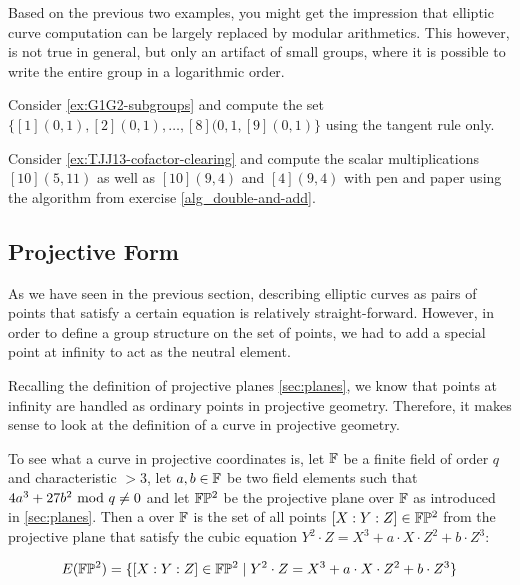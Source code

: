 Based on the previous two examples, you  might get the impression that elliptic curve computation can be largely replaced by modular arithmetics. This however, is not true in general, but only an artifact of small groups, where it is possible to write the entire group in a logarithmic order.
\begin{exercise} Consider \examplename{} \ref{ex:G1G2-subgroups} and compute the set 
$\{[1](0,1), [2](0,1),\ldots,[8](0,1,[9](0,1)\}$ using the tangent rule only.
\end{exercise}
\begin{exercise} Consider \examplename{} \ref{ex:TJJ13-cofactor-clearing} and compute the scalar multiplications $[10](5,11)$ as well as $[10](9,4)$ and $[4](9,4)$ with pen and paper using the algorithm from exercise \ref{alg_double-and-add}.
\end{exercise}
\subsection{Projective  Form}
As we have seen in the previous section, describing elliptic curves as pairs of points that satisfy a certain equation is relatively straight-forward. However, in order to define a group structure on the set of points, we had to add a special point at infinity to act as the neutral element. 

Recalling the definition of projective planes \ref{sec:planes}, we know that points at infinity are handled as ordinary points in projective geometry. Therefore, it makes  sense to look at the definition of a  curve in projective geometry.

To see what a  curve in projective coordinates is, let $\mathbb{F}$ be a finite field of order $q$ and characteristic $>3$, let $a,b\in \mathbb{F}$ be two field elements such that $4a^3+ 27b^2 \text{ mod } q\neq 0$ and let $\mathbb{F}\mathbb{P}^2$ be the projective plane over $\mathbb{F}$ as introduced in \secname{} \ref{sec:planes}. Then a  over $\mathbb{F}$ is the set of all points $[X:Y:Z]\in \mathbb{F}\mathbb{P}^2$ from the projective plane that satisfy the cubic equation $Y^2\cdot Z = X^3+a\cdot X\cdot Z^2 + b\cdot Z^3$:

\begin{equation}
\label{def:projective_cubic_equation}
E(\mathbb{F}\mathbb{P}^2) = \{[X:Y:Z]\in \mathbb{F}\mathbb{P}^2\;|\; Y^2\cdot Z = X^3+a\cdot X\cdot Z^2 + b\cdot Z^3 \}
\end{equation}

